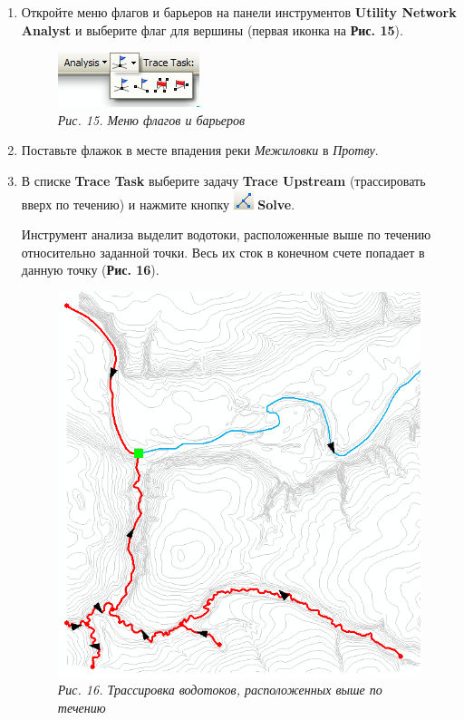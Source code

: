 \documentclass[]{book}
\theoremstyle{definition}
\theoremstyle{definition}
\theoremstyle{definition}
\theoremstyle{remark}
\begin{document}
\begin{enumerate}
\def\labelenumi{\arabic{enumi}.}
\item
  Откройте меню флагов и барьеров на панели инструментов \textbf{Utility
  Network Analyst} и выберите флаг для вершины (первая иконка на
  \textbf{Рис. 15}).

  \begin{figure}
  \centering
  \includegraphics{images/Ex13/image28.png}
  \caption{\emph{Рис. 15. Меню флагов и барьеров}}
  \end{figure}
\item
  Поставьте флажок в месте впадения реки \emph{Межиловки} в
  \emph{Протву}.
\item
  В списке \textbf{Trace Task} выберите задачу \textbf{Trace Upstream}
  (трассировать вверх по течению) и нажмите кнопку
  \includegraphics{images/Ex13/image29.png} \textbf{Solve}.

  Инструмент анализа выделит водотоки, расположенные выше по течению
  относительно заданной точки. Весь их сток в конечном счете попадает в
  данную точку (\textbf{Рис. 16}).

  \begin{figure}
  \centering
  \includegraphics{images/Ex13/image30.png}
  \caption{\emph{Рис. 16. Трассировка водотоков, расположенных выше по
  течению}}
  \end{figure}


\end{enumerate}
\end{document}
